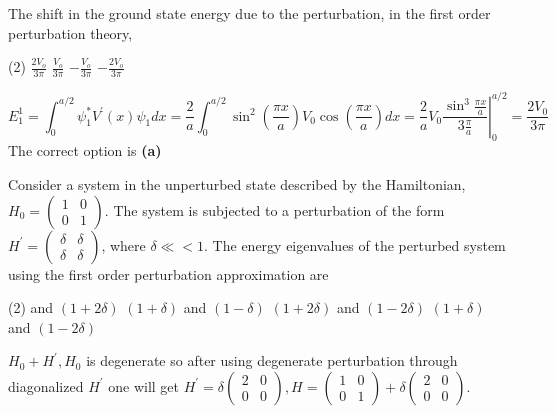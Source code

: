 \begin{enumerate}
\begin{minipage}{\textwidth}
$$		$$
		The shift in the ground state energy due to the perturbation, in the first order perturbation theory,
	\end{minipage}
	\begin{tasks}(2)
		\task[\textbf{A.}] $\frac{2 V_{o}}{3 \pi}$
		\task[\textbf{B.}]$\frac{V_{o}}{3 \pi}$
		\task[\textbf{C.}]$-\frac{V_{o}}{3 \pi}$
		\task[\textbf{D.}]$-\frac{2 V_{o}}{3 \pi}$
	\end{tasks}
	\begin{answer}
		$$E_{1}^{1}=\int_{0}^{a / 2} \psi_{1}^{*} V^{\prime}(x) \psi_{1} d x=\frac{2}{a} \int_{0}^{a / 2} \sin ^{2}\left(\frac{\pi x}{a}\right) V_{0} \cos \left(\frac{\pi x}{a}\right) d x=\left.\frac{2}{a} V_{0} \frac{\sin ^{3} \frac{\pi x}{a}}{3 \frac{\pi}{a}}\right|_{0} ^{a / 2}=\frac{2 V_{0}}{3 \pi}$$
		The correct option is \textbf{(a)}	
	\end{answer}
	\begin{minipage}{\textwidth}
		\item Consider a system in the unperturbed state described by the Hamiltonian, $H_{0}=\left(\begin{array}{ll}1 & 0 \\ 0 & 1\end{array}\right)$. The system is subjected to a perturbation of the form $H^{\prime}=\left(\begin{array}{ll}\delta & \delta \\ \delta & \delta\end{array}\right)$, where $\delta \ll<1$. The energy eigenvalues of the perturbed system using the first order perturbation approximation are
	\end{minipage}
	\begin{tasks}(2)
		 and $(1+2 \delta)$
		\task[\textbf{B.}]$(1+\delta)$ and $(1-\delta)$
		\task[\textbf{C.}]$(1+2 \delta)$ and $(1-2 \delta)$
		\task[\textbf{D.}]$(1+\delta)$ and $(1-2 \delta)$
	\end{tasks}
	\begin{answer}
		$H_{0}+H^{\prime}, H_{0}$ is degenerate so after using degenerate perturbation through diagonalized $H^{\prime}$ one will get $H^{\prime}=\delta\left(\begin{array}{ll}2 & 0 \\ 0 & 0\end{array}\right), H=\left(\begin{array}{ll}1 & 0 \\ 0 & 1\end{array}\right)+\delta\left(\begin{array}{ll}2 & 0 \\ 0 & 0\end{array}\right)$.

\end{answer}
\end{enumerate}
